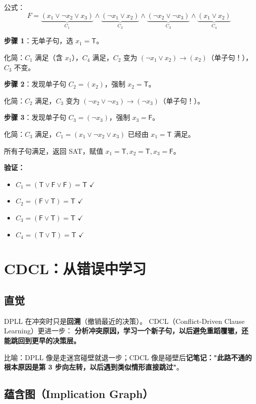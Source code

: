 \documentclass[UTF8,openany,12pt]{ctexbook}
\theoremstyle{remark}
\begin{document}
公式：
\[
  F = \underbrace{(x_1 \vee \neg x_2 \vee x_3)}_{C_1}
    \wedge \underbrace{(\neg x_1 \vee x_2)}_{C_2}
    \wedge \underbrace{(\neg x_2 \vee \neg x_3)}_{C_3}
    \wedge \underbrace{(x_1 \vee x_2)}_{C_4}
\]

\textbf{步骤 1}：无单子句，选 $x_1 = \mathsf{T}$。

化简：$C_1$ 满足（含 $x_1$），$C_4$ 满足，$C_2$ 变为 $(\neg x_1 \vee x_2) \to (x_2)$（单子句！），$C_3$ 不变。

\textbf{步骤 2}：发现单子句 $C_2 = (x_2)$，强制 $x_2 = \mathsf{T}$。

化简：$C_2$ 满足，$C_3$ 变为 $(\neg x_2 \vee \neg x_3) \to (\neg x_3)$（单子句！）。

\textbf{步骤 3}：发现单子句 $C_3 = (\neg x_3)$，强制 $x_3 = \mathsf{F}$。

化简：$C_3$ 满足，$C_1 = (x_1 \vee \neg x_2 \vee x_3)$ 已经由 $x_1=\mathsf{T}$ 满足。

所有子句满足，返回 SAT，赋值 $x_1 = \mathsf{T}, x_2 = \mathsf{T}, x_3 = \mathsf{F}$。

\textbf{验证：}
\begin{itemize}
  \item $C_1 = (\mathsf{T} \vee \mathsf{F} \vee \mathsf{F}) = \mathsf{T}$ $\checkmark$
  \item $C_2 = (\mathsf{F} \vee \mathsf{T}) = \mathsf{T}$ $\checkmark$
  \item $C_3 = (\mathsf{F} \vee \mathsf{T}) = \mathsf{T}$ $\checkmark$
  \item $C_4 = (\mathsf{T} \vee \mathsf{T}) = \mathsf{T}$ $\checkmark$
\end{itemize}

\section{CDCL：从错误中学习}

\subsection{直觉}

DPLL 在冲突时只是\textbf{回溯}（撤销最近的决策）。
CDCL（Conflict-Driven Clause Learning）更进一步：
\textbf{分析冲突原因，学习一个新子句，以后避免重蹈覆辙，还能跳回到更早的决策层。}

比喻：DPLL 像是走迷宫碰壁就退一步；CDCL 像是碰壁后\textbf{记笔记："此路不通的根本原因是第 3 步向左转，以后遇到类似情形直接跳过"}。

\subsection{蕴含图（Implication Graph）}
\end{document}
